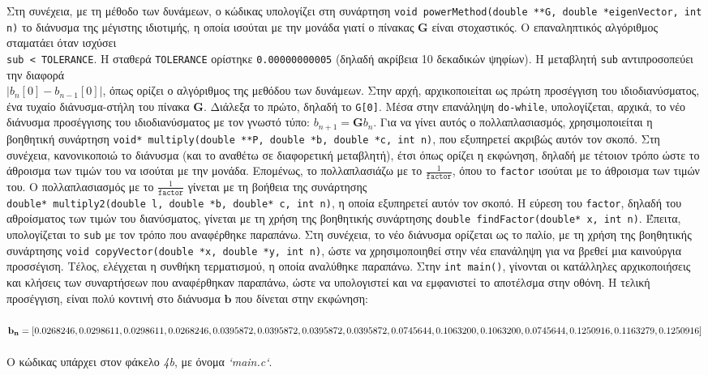 \documentclass[a4paper, 14pt]{article}   %
\begin{document}
	Στη συνέχεια, με τη μέθοδο των δυνάμεων, ο κώδικας υπολογίζει στη συνάρτηση \texttt{void powerMethod(double **G, double *eigenVector, int n)} το διάνυσμα της μέγιστης ιδιοτιμής, η οποία ισούται με την μονάδα γιατί ο πίνακας $\mathbf{G}$ είναι στοχαστικός. Ο επαναληπτικός αλγόριθμος σταματάει όταν ισχύσει\\ \texttt{sub < TOLERANCE}. Η σταθερά \texttt{TOLERANCE} ορίστηκε \texttt{0.00000000005} (δηλαδή ακρίβεια 10 δεκαδικών ψηφίων). Η μεταβλητή \texttt{sub} αντιπροσοπεύει την διαφορά\\ $|b_n[0] - b_{n-1}[0]|$, όπως ορίζει ο αλγόριθμος της μεθόδου των δυνάμεων. Στην αρχή, αρχικοποιείται ως πρώτη προσέγγιση του ιδιοδιανύσματος, ένα τυχαίο διάνυσμα-στήλη του πίνακα $\mathbf{G}$. Διάλεξα το πρώτο, δηλαδή το \texttt{G[0]}. Μέσα στην επανάληψη \texttt{do-while}, υπολογίζεται, αρχικά, το νέο διάνυσμα προσέγγισης του ιδιοδιανύσματος με τον γνωστό τύπο: $b_{n+1} = \mathbf{G}b_n$. Για να γίνει αυτός ο πολλαπλασιασμός, χρησιμοποιείται η βοηθητική συνάρτηση \texttt{void* multiply(double **P, double *b, double *c, int n)}, που εξυπηρετεί ακριβώς αυτόν τον σκοπό. Στη συνέχεια, κανονικοποιώ το διάνυσμα (και το αναθέτω σε διαφορετική μεταβλητή), έτσι όπως ορίζει η εκφώνηση, δηλαδή με τέτοιον τρόπο ώστε το άθροισμα των τιμών του να ισούται με την μονάδα. Επομένως, το πολλαπλασιάζω με το $\frac{1}{\texttt{factor}}$, όπου το \texttt{factor} ισούται με το άθροισμα των τιμών του. Ο πολλαπλασιασμός με το $\frac{1}{\texttt{factor}}$ γίνεται με τη βοήθεια της συνάρτησης \\ \texttt{double* multiply2(double l, double *b, double* c, int n)}, η οποία εξυπηρετεί αυτόν τον σκοπό. Η εύρεση του \texttt{factor}, δηλαδή του αθροίσματος των τιμών του διανύσματος, γίνεται με τη χρήση της βοηθητικής συνάρτησης \texttt{double findFactor(double* x, int n)}. Έπειτα, υπολογίζεται το \texttt{sub} με τον τρόπο που αναφέρθηκε παραπάνω. Στη συνέχεια, το νέο διάνυσμα ορίζεται ως το παλίο, με τη χρήση της βοηθητικής συνάρτησης \texttt{void copyVector(double *x, double *y, int n)}, ώστε να χρησιμοποιηθεί στην νέα επανάληψη για να βρεθεί μια καινούργια προσσέγιση. Τέλος, ελέγχεται η συνθήκη τερματισμού, η οποία αναλύθηκε παραπάνω. Στην \texttt{int main()}, γίνονται οι κατάλληλες αρχικοποιήσεις και κλήσεις των συναρτήσεων που αναφέρθηκαν παραπάνω, ώστε να υπολογιστεί και να εμφανιστεί το αποτέλσμα στην οθόνη. Η τελική προσέγγιση, είναι πολύ κοντινή στο διάνυσμα $\textbf{b}$ που δίνεται στην εκφώνηση:\\\\
$\mathbf{b_n} = [0.0268246, 0.0298611, 0.0298611, 0.0268246, 0.0395872, 0.0395872, 0.0395872,\\ 0.0395872, 0.0745644, 0.1063200, 0.1063200, 0.0745644, 0.1250916, 0.1163279,  0.1250916]$\\\\
Ο κώδικας υπάρχει στον φάκελο \emph{4b}, με όνομα \emph{`main.c`}.
\\\\
\end{document}
